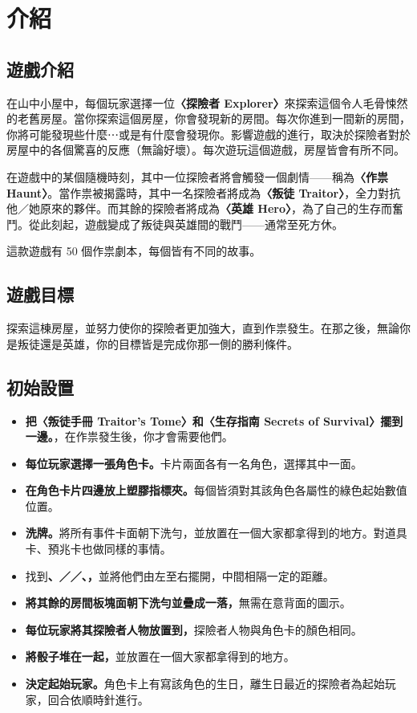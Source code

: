 
\section{介紹}

\subsection{遊戲介紹}
在山中小屋中，每個玩家選擇一位\textbf{〈探險者 Explorer〉}來探索這個令人毛骨悚然的老舊房屋。當你探索這個房屋，你會發現新的房間。每次你進到一間新的房間，你將可能發現些什麼⋯或是有什麼會發現你。影響遊戲的進行，取決於探險者對於房屋中的各個驚喜的反應（無論好壞）。每次遊玩這個遊戲，房屋皆會有所不同。\par
在遊戲中的某個隨機時刻，其中一位探險者將會觸發一個劇情——稱為\textbf{〈作祟 Haunt〉}。當作祟被揭露時，其中一名探險者將成為\textbf{〈叛徒 Traitor〉}，全力對抗他／她原來的夥伴。而其餘的探險者將成為\textbf{〈英雄 Hero〉}，為了自己的生存而奮鬥。從此刻起，遊戲變成了叛徒與英雄間的戰鬥——通常至死方休。\par
這款遊戲有 50 個作祟劇本，每個皆有不同的故事。

\subsection{遊戲目標}
探索這棟房屋，並努力使你的探險者更加強大，直到作祟發生。在那之後，無論你是叛徒還是英雄，你的目標皆是完成你那一側的勝利條件。

\subsection{初始設置}
\begin{itemize}
  \item \textbf{把〈叛徒手冊 Traitor’s Tome〉和〈生存指南 Secrets of Survival〉擺到一邊。}，在作祟發生後，你才會需要他們。
  \item \textbf{每位玩家選擇一張角色卡。}卡片兩面各有一名角色，選擇其中一面。
  \item \textbf{在角色卡片四邊放上塑膠指標夾。}每個皆須對其該角色各屬性的綠色起始數值位置。
  \item \textbf{洗牌。}將所有事件卡面朝下洗勻，並放置在一個大家都拿得到的地方。對道具卡、預兆卡也做同樣的事情。
  \item 找到\textbf{、／／、，}並將他們由左至右擺開，中間相隔一定的距離。
  \item \textbf{將其餘的房間板塊面朝下洗勻並疊成一落，}無需在意背面的圖示。
  \item \textbf{每位玩家將其探險者人物放置到，}探險者人物與角色卡的顏色相同。
  \item \textbf{將骰子堆在一起，}並放置在一個大家都拿得到的地方。
  \item \textbf{決定起始玩家。}角色卡上有寫該角色的生日，離生日最近的探險者為起始玩家，回合依順時針進行。
\end{itemize}
